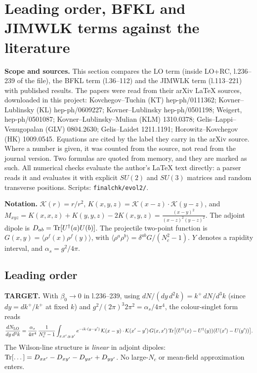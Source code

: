 \section{Leading order, BFKL and JIMWLK terms against the literature}
\label{sec:lit-lo-bfkl-jimwlk}

\noindent\textbf{Scope and sources.} This section compares the LO term (inside LO+RC, l.236--239 of the file), the BFKL term (l.36--112) and the JIMWLK term (l.113--221) with published results. The papers were read from their arXiv \LaTeX{} sources, downloaded in this project: Kovchegov--Tuchin (KT) hep-ph/0111362; Kovner--Lublinsky (KL) hep-ph/0609227; Kovner--Lublinsky hep-ph/0501198; Weigert, hep-ph/0501087; Kovner--Lublinsky--Mulian (KLM) 1310.0378; Gelis--Lappi--Venugopalan (GLV) 0804.2630; Gelis--Laidet 1211.1191; Horowitz--Kovchegov (HK) 1009.0545. Equations are cited by the label they carry in the arXiv source. Where a number is given, it was counted from the source, not read from the journal version. Two formulas are quoted from memory, and they are marked as such. All numerical checks evaluate the author's \LaTeX{} text directly: a parser reads it and evaluates it with explicit $SU(2)$ and $SU(3)$ matrices and random transverse positions. Scripts: \texttt{finalchk/evol2/}.

\medskip\noindent\textbf{Notation.} $\mathcal K(r)=r/r^2$, $K(x,y,z)=\mathcal K(x-z)\cdot\mathcal K(y-z)$, and
$M_{xyz}=K(x,x,z)+K(y,y,z)-2K(x,y,z)=\frac{(x-y)^2}{(x-z)^2(y-z)^2}$. The adjoint dipole is $D_{ab}={\rm Tr}[U^\dagger(a)U(b)]$. The projectile two-point function is $G(x,y)=\langle\rho^f(x)\rho^f(y)\rangle$, with $\langle\rho^a\rho^b\rangle=\delta^{ab}G/(N_c^2-1)$. $Y$ denotes a rapidity interval, and $\alpha_s=g^2/4\pi$.

\subsection{Leading order}
\textbf{TARGET.} With $\beta_0\to0$ in l.236--239, using $dN/(dy\,d^2k)=k^+\,dN/d^3k$ (since $dy=dk^+/k^+$ at fixed $k$) and $g^2/(2\pi)^3 2\pi^2=\alpha_s/4\pi^4$, the colour-singlet form reads
\begin{equation}
\frac{dN_{\rm LO}}{dy\,d^2k}=\frac{\alpha_s}{4\pi^4}\,\frac{1}{N_c^2-1}\int_{x,x',y,y'}e^{-ik\cdot(y-y')}\,\mathcal K(x-y)\cdot\mathcal K(x'-y')\,G(x,x')\,
{\rm Tr}\big[(U^\dagger(x)-U^\dagger(y))(U(x')-U(y'))\big].
\label{eq:LOsinglet}
\end{equation}
The Wilson-line structure is \emph{linear} in adjoint dipoles: ${\rm Tr}[\dots]=D_{xx'}-D_{xy'}-D_{yx'}+D_{yy'}$. No large-$N_c$ or mean-field approximation enters.

